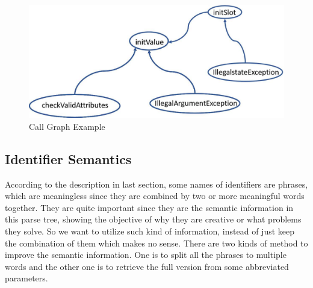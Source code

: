 
\begin{figure}[!htp]
 \centering
 \includegraphics[width=0.8\columnwidth]{img/callGraph.pdf}
 \caption{\label{figure:callGraph} Call Graph Example}
\end{figure}

\subsection{Identifier Semantics}\label{sec:identifier}

According to the description in last section, some names of identifiers are phrases, which are meaningless since they are combined by
two or more meaningful words together. They are quite important since they are the semantic information in this parse tree, showing the objective of why
they are creative or what problems they solve. So we want to utilize such kind of information, instead of just keep the combination of them which makes no
sense. There are two kinds of method to improve the semantic information. One is to split all the phrases to multiple words and the other one is to retrieve the
full version from some abbreviated parameters.

